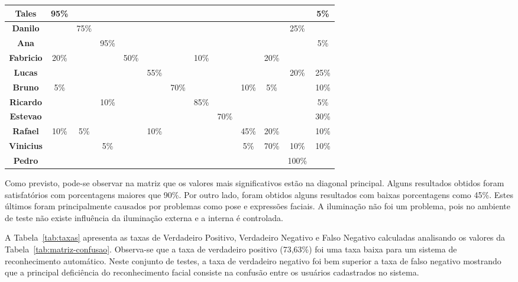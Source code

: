 \begin{table}[htb]
\begin{center}
\begin{tabular}{|c|c|c|c|c|c|c|c|c|c|c|c|c|}
				\hline \bf Tales 		& 95\% & 			& 		 & 			&   	 & 			& 		 & 			& 		 & 			& 		 & 5\%	\\ 
				\hline \bf Danilo 	& 		 & 75\% & 		 & 			&   	 & 			& 		 & 			& 		 & 			& 25\% &		 	\\
				\hline \bf Ana 			& 		 & 			& 95\% & 			&   	 & 			& 		 & 			& 		 & 			& 		 & 5\%  \\
				\hline \bf Fabricio & 20\% & 			& 		 & 50\% &      & 			& 10\% & 			&  	   & 20\% & 		 &		  \\
				\hline \bf Lucas 		& 		 & 			& 		 & 			& 55\% & 			& 		 & 			& 		 & 			& 20\% & 25\% \\
				\hline \bf Bruno 		& 5\%	 & 			& 		 & 			& 		 & 70\% & 		 & 			& 10\% & 	5\%	& 		 & 10\%	\\
				\hline \bf Ricardo 	& 		 & 			& 10\% & 			& 		 & 			& 85\% & 			& 		 & 			& 		 & 5\%  \\
				\hline \bf Estevao 	& 		 & 			& 		 & 			& 		 & 			& 		 & 70\% & 		 & 			& 		 & 30\% \\
				\hline \bf Rafael 	& 10\% & 	5\%	& 		 & 			& 10\% & 			& 		 & 			& 45\% & 20\% & 		 & 10\% \\
				\hline \bf Vinicius & 		 & 			& 5\%  & 			& 		 & 			& 		 & 			& 5\%  & 70\% & 10\% & 10\% \\
				\hline \bf Pedro 		& 		 & 			& 		 & 			& 		 & 			& 		 & 			& 		 & 			& 100\%&		  \\
				\hline
			\end{tabular}
		\end{center}
	\end{table}

	Como previsto, pode-se observar na matriz que os valores mais significativos estão na diagonal principal. Alguns resultados obtidos foram satisfatórios com porcentagens maiores que 90\%. Por outro lado, foram obtidos alguns resultados com baixas porcentagens como 45\%. Estes últimos foram principalmente causados por problemas como pose e expressões faciais. A iluminação não foi um problema, pois no ambiente de teste não existe influência da iluminação externa e a interna é controlada. 

	A Tabela~\ref{tab:taxas} apresenta as taxas de Verdadeiro Positivo, Verdadeiro Negativo e Falso Negativo calculadas analisando os valores da Tabela~\ref{tab:matriz-confusao}. Observa-se que a taxa de verdadeiro positivo (73,63\%) foi uma taxa baixa para um sistema de reconhecimento automático. Neste conjunto de testes, a taxa de verdadeiro negativo foi bem superior a taxa de falso negativo mostrando que a principal deficiência do reconhecimento facial consiste na confusão entre os usuários cadastrados no sistema.


